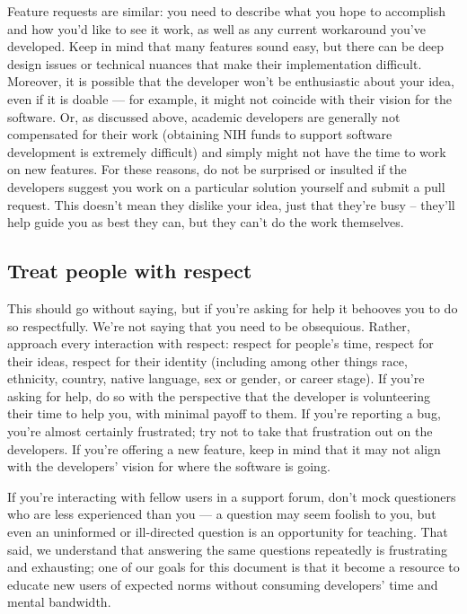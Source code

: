 \documentclass[9pt,training,ASAPversion]{livecoms}
\begin{document}
Feature requests are similar: you need to describe what you hope to accomplish
and how you'd like to see it work, as well as any current workaround you've
developed. Keep in mind that many features sound easy, but there can be deep
design issues or technical nuances that make their implementation difficult.
Moreover, it is possible that the developer won't be enthusiastic about your
idea, even if it is doable --- for example, it might not coincide with their
vision for the software. Or, as discussed above, academic developers are
generally not compensated for their work (obtaining NIH funds to support
software development is extremely difficult) and simply might not have the time
to work on new features. For these reasons, do not be surprised or insulted if
the developers suggest you work on a particular solution yourself and submit a
pull request. This doesn't mean they dislike your idea, just that they're busy -- they'll help guide you as best they can, but they can't do the work themselves.

\subsection{Treat people with respect}

This should go without saying, but if you're asking for help it behooves you to
do so respectfully. We're not saying that you need to be obsequious. Rather,
approach every interaction with respect: respect for people's time, respect for
their ideas, respect for their identity (including among other things race,
ethnicity, country, native language, sex or gender, or career stage). If you're
asking for help, do so with the perspective that the developer is volunteering
their time to help you, with minimal payoff to them.  If you're reporting a bug,
you're almost certainly frustrated; try not to take that frustration out on the
developers. If you're offering a new feature, keep in mind that it may not align
with the developers' vision for where the software is going.

If you're interacting with fellow users in a support forum, don't mock
questioners who are less experienced than you --- a question may seem foolish to
you, but even an uninformed or ill-directed question is an opportunity for
teaching. That said, we understand that answering the same questions repeatedly
is frustrating and exhausting; one of our goals for this document is that it
become a resource to educate new users of expected norms without consuming
developers' time and mental bandwidth.
\end{document}
